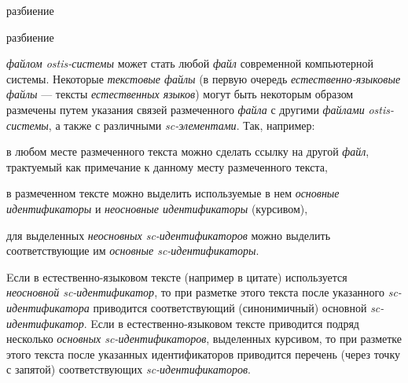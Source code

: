\begin{SCn}

    \begin{scnrelfromset}{разбиение}
    \end{scnrelfromset}
    \begin{scnrelfromset}{разбиение}
            \begin{scnindent}
            \scnidtf{обозначение одного из вхождений (однорго из экземпляров) информационной конструкции]}
            \end{scnindent}
            \begin{scnindent}
            \end{scnindent}
    \end{scnrelfromset}

\end{SCn}

    \textit{файлом ostis-системы} может стать любой \textit{файл} современной компьютерной системы.
    Некоторые \textit{текстовые файлы} (в первую очередь \textit{естественно-языковые файлы} --- тексты \textit{естественных языков}) могут быть некоторым образом размечены путем указания связей размеченного \textit{файла} с другими \textit{файлами} \textit{ostis-системы}, а также с различными \textit{sc-элементами}.
    Так, например:
    \begin{textitemize}
        \item в любом месте размеченного текста можно сделать ссылку на другой \textit{файл}, трактуемый как примечание к данному месту размеченного текста,
        \item в размеченном тексте можно выделить используемые в нем \textit{основные идентификаторы} и \textit{неосновные идентификаторы} (курсивом),
        \item для выделенных \textit{неосновных sc-идентификаторов} можно выделить соответствующие им \textit{основные sc-идентификаторы}.
    \end{textitemize}

    Eсли в естественно-языковом тексте (например в цитате) используется \textit{неосновной sc-идентификатор}, то при разметке этого текста после указанного \textit{sc-идентификатора} приводится соответствующий (синонимичный) основной \textit{sc-идентификатор}.
    Eсли в естественно-языковом тексте приводится подряд несколько \textit{основных sc-идентификаторов}, выделенных курсивом, то при разметке этого текста после указанных идентификаторов приводится перечень (через точку с запятой) соответствующих \textit{sc-идентификаторов}.

